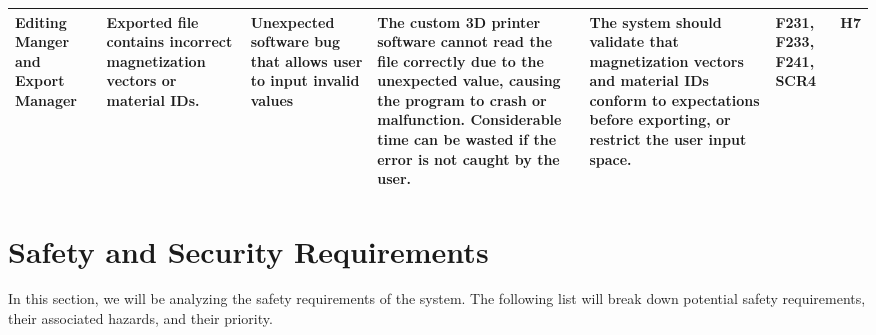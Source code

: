 \documentclass{article}
\begin{document}
\begin{landscape}
\begin{table}[H]
\begin{tabular}{|p{3cm}|p{3cm}|p{3.8cm}|p{3.8cm}|p{5.5cm}|p{2cm}|p{1cm}|}
\hline
Editing Manger and Export Manager & Exported file contains incorrect magnetization vectors or material IDs. & \textbullet{} Unexpected software bug that allows user to input invalid values & \textbullet{} The custom 3D printer software cannot read the file correctly due to the unexpected value, causing the program to crash or malfunction. \newline \textbullet{} Considerable time can be wasted if the error is not caught by the user. & The system should validate that magnetization vectors and material IDs conform to expectations before exporting, or restrict the user input space. & F231, F233, F241, SCR4 & H7 \\
\hline
\end{tabular}
\end{table}
\end{landscape}
\restoregeometry

\section{Safety and Security Requirements}

In this section, we will be analyzing the safety requirements of the system. The following list will break down potential safety requirements, their associated hazards, and their priority.
\end{document}
